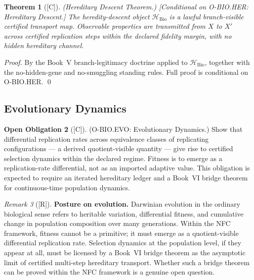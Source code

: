 \documentclass[12pt,oneside]{amsbook}
\theoremstyle{plain}
\newtheorem{theorem}{Theorem}[section]
\theoremstyle{definition}
\newtheorem{obligation}[theorem]{Open Obligation}
\theoremstyle{remark}
\newtheorem{remark}[theorem]{Remark}
\newcommand{\status}[1]{\textup{[#1]}}
\begin{document}
\begin{theorem}[\status{C}]\label{thm:bio-hereditary-descent}
\textup{(Hereditary Descent Theorem.)}
\textup{[Conditional on O-BIO.HER: Hereditary Descent.]}
The heredity-descent object $\mathcal{H}_{\mathrm{Bio}}$ is a lawful
branch-visible certified transport map. Observable properties are
transmitted from $X$ to $X'$ across certified replication steps
within the declared fidelity margin, with no hidden hereditary
channel.
\end{theorem}

\begin{proof}
By the Book~V branch-legitimacy doctrine applied to
$\mathcal{H}_{\mathrm{Bio}}$, together with the no-hidden-gene and
no-smuggling standing rules. Full proof is conditional on O-BIO.HER.
\qed
\end{proof}

\subsection{Evolutionary Dynamics}\label{sec:bio-EVO}

\begin{obligation}[\status{C}]\label{ob:bio-EVO}
\textup{(O-BIO.EVO: Evolutionary Dynamics.)}
Show that differential replication rates across equivalence classes
of replicating configurations --- a derived quotient-visible quantity
--- give rise to certified selection dynamics within the declared
regime. Fitness is to emerge as a replication-rate differential, not
as an imported adaptive value. This obligation is expected to require
an iterated hereditary ledger and a Book~VI bridge theorem for
continuous-time population dynamics.
\end{obligation}

\begin{remark}[\status{R}]\label{rem:bio-evo-posture}
\textbf{Posture on evolution.}
Darwinian evolution in the ordinary biological sense refers to
heritable variation, differential fitness, and cumulative change in
population composition over many generations. Within the NFC
framework, fitness cannot be a primitive; it must emerge as a
quotient-visible differential replication rate. Selection dynamics
at the population level, if they appear at all, must be licensed by
a Book~VI bridge theorem as the asymptotic limit of certified
multi-step hereditary transport. Whether such a bridge theorem can
be proved within the NFC framework is a genuine open question.
\end{remark}
\end{document}
